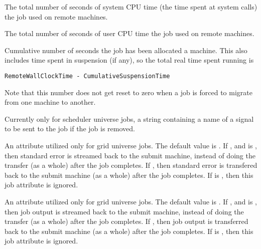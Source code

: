\begin{description}
\item[\AdAttr{RemoteSysCpu}:]  The total number of seconds
of system CPU time (the time spent at system calls) the job used
on remote machines.

\item[\AdAttr{RemoteUserCpu}:]  The total number of seconds
of user CPU time the job used on remote machines.

\label{RemoteWallClockTime}
\item[\AdAttr{RemoteWallClockTime}:]  Cumulative number of seconds
the job has been allocated a machine.
This also includes time spent in suspension (if any),
so the total real time spent running is 
\begin{verbatim}
RemoteWallClockTime - CumulativeSuspensionTime
\end{verbatim}
Note that this number does not get reset to
zero when a job is forced to migrate from one machine to another.

\item[\AdAttr{RemoveKillSig}:]    Currently only for scheduler universe jobs,
a string containing a name of
a signal to be sent to the job if the job is removed.

\item[\AdAttr{StreamErr}:]   
An attribute utilized only for grid universe jobs.
The default value is .
If , and  is , then 
standard error is streamed back to the submit machine, instead
of doing the transfer (as a whole) after the job completes.
If , then
standard error is transfered back to the submit machine
(as a whole) after the job completes.
If  is , then this job attribute is ignored.

\item[\AdAttr{StreamOut}:]   
An attribute utilized only for grid universe jobs.
The default value is .
If , and  is , then 
job output is streamed back to the submit machine, instead
of doing the transfer (as a whole) after the job completes.
If , then
job output is transferred back to the submit machine
(as a whole) after the job completes.
If  is , then this job attribute is ignored.


\end{description}
